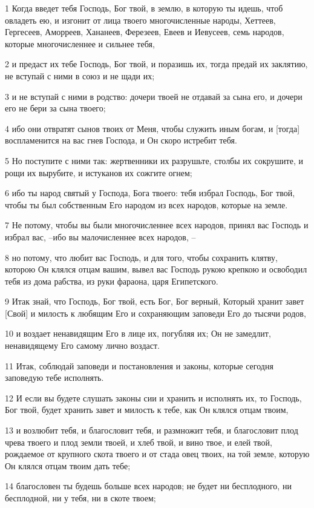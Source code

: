 \par 1 Когда введет тебя Господь, Бог твой, в землю, в которую ты идешь, чтоб овладеть ею, и изгонит от лица твоего многочисленные народы, Хеттеев, Гергесеев, Аморреев, Хананеев, Ферезеев, Евеев и Иевусеев, семь народов, которые многочисленнее и сильнее тебя,
\par 2 и предаст их тебе Господь, Бог твой, и поразишь их, тогда предай их заклятию, не вступай с ними в союз и не щади их;
\par 3 и не вступай с ними в родство: дочери твоей не отдавай за сына его, и дочери его не бери за сына твоего;
\par 4 ибо они отвратят сынов твоих от Меня, чтобы служить иным богам, и [тогда] воспламенится на вас гнев Господа, и Он скоро истребит тебя.
\par 5 Но поступите с ними так: жертвенники их разрушьте, столбы их сокрушите, и рощи их вырубите, и истуканов их сожгите огнем;
\par 6 ибо ты народ святый у Господа, Бога твоего: тебя избрал Господь, Бог твой, чтобы ты был собственным Его народом из всех народов, которые на земле.
\par 7 Не потому, чтобы вы были многочисленнее всех народов, принял вас Господь и избрал вас, --ибо вы малочисленнее всех народов, --
\par 8 но потому, что любит вас Господь, и для того, чтобы сохранить клятву, которою Он клялся отцам вашим, вывел вас Господь рукою крепкою и освободил тебя из дома рабства, из руки фараона, царя Египетского.
\par 9 Итак знай, что Господь, Бог твой, есть Бог, Бог верный, Который хранит завет [Свой] и милость к любящим Его и сохраняющим заповеди Его до тысячи родов,
\par 10 и воздает ненавидящим Его в лице их, погубляя их; Он не замедлит, ненавидящему Его самому лично воздаст.
\par 11 Итак, соблюдай заповеди и постановления и законы, которые сегодня заповедую тебе исполнять.
\par 12 И если вы будете слушать законы сии и хранить и исполнять их, то Господь, Бог твой, будет хранить завет и милость к тебе, как Он клялся отцам твоим,
\par 13 и возлюбит тебя, и благословит тебя, и размножит тебя, и благословит плод чрева твоего и плод земли твоей, и хлеб твой, и вино твое, и елей твой, рождаемое от крупного скота твоего и от стада овец твоих, на той земле, которую Он клялся отцам твоим дать тебе;
\par 14 благословен ты будешь больше всех народов; не будет ни бесплодного, ни бесплодной, ни у тебя, ни в скоте твоем;
